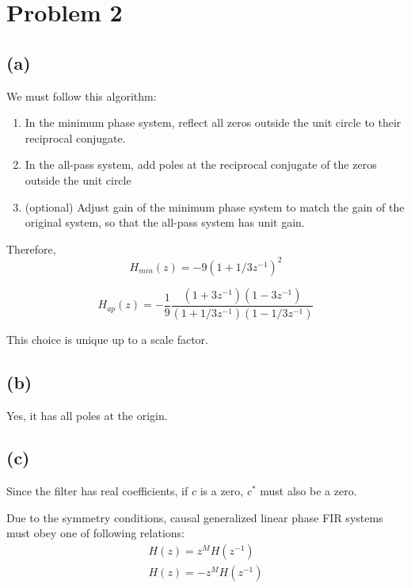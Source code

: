 \documentclass{article}
\begin{document}
\newpage

\section{Problem 2}
\subsection{(a)}

\begin{figure}[!h]
	\resizebox{0.9\textwidth}{!}{}
\end{figure}

We must follow this algorithm:
\begin{enumerate}
	\item In the minimum phase system, reflect all zeros outside the unit circle to their reciprocal conjugate.
	\item In the all-pass system, add poles at the reciprocal conjugate of the zeros outside the unit circle
	\item (optional) Adjust gain of the minimum phase system to match the gain of the original system, so that the all-pass system has unit gain.
\end{enumerate}

Therefore,
\begin{equation}
H_{min}(z) = -9(1 + 1/3z^{-1})^2
\end{equation}

\begin{equation}
H_{ap}(z) = -\frac{1}{9}\frac{(1 + 3z^{-1})(1 - 3z^{-1})}{(1 + 1/3z^{-1})(1 - 1/3z^{-1})}
\end{equation}
	
This choice is unique up to a scale factor.
	
\subsection{(b)}
Yes, it has all poles at the origin.

\subsection{(c)}

Since the filter has real coefficients, if $c$ is a zero, $c^*$ must also be a zero.

Due to the symmetry conditions, causal generalized linear phase FIR systems must obey one of following relations:
\begin{align*}
H(z) = z^MH(z^{-1}) \tag{if even symmetric} \\
H(z) = -z^MH(z^{-1}) \tag{if odd symmetric} \\
\end{align*}
\end{document}
